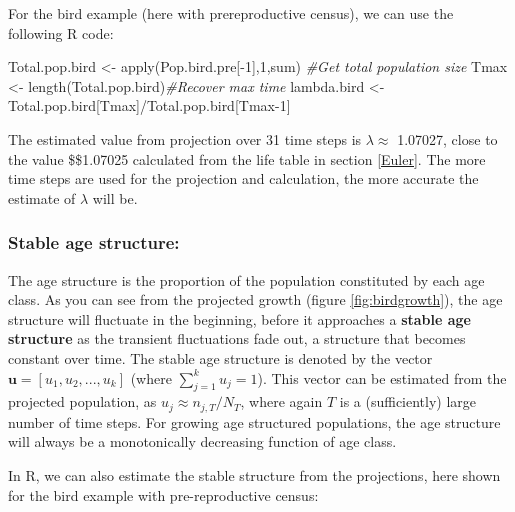 \documentclass[
]{book}
\newenvironment{Shaded}{\begin{snugshade}}{\end{snugshade}}
\newcommand{\CommentTok}[1]{\textcolor[rgb]{0.56,0.35,0.01}{\textit{#1}}}
\newcommand{\DecValTok}[1]{\textcolor[rgb]{0.00,0.00,0.81}{#1}}
\newcommand{\FunctionTok}[1]{\textcolor[rgb]{0.00,0.00,0.00}{#1}}
\newcommand{\NormalTok}[1]{#1}
\newcommand{\OtherTok}[1]{\textcolor[rgb]{0.56,0.35,0.01}{#1}}
\newcommand{\SpecialCharTok}[1]{\textcolor[rgb]{0.00,0.00,0.00}{#1}}
\begin{document}
For the bird example (here with prereproductive census), we can use the following R code:

\begin{Shaded}
\begin{Highlighting}[]
\NormalTok{Total.pop.bird }\OtherTok{\textless{}{-}} \FunctionTok{apply}\NormalTok{(Pop.bird.pre[}\SpecialCharTok{{-}}\DecValTok{1}\NormalTok{],}\DecValTok{1}\NormalTok{,sum) }\CommentTok{\#Get total population size}
\NormalTok{Tmax }\OtherTok{\textless{}{-}} \FunctionTok{length}\NormalTok{(Total.pop.bird)}\CommentTok{\#Recover max time}
\NormalTok{lambda.bird }\OtherTok{\textless{}{-}}\NormalTok{ Total.pop.bird[Tmax]}\SpecialCharTok{/}\NormalTok{Total.pop.bird[Tmax}\DecValTok{{-}1}\NormalTok{]}
\end{Highlighting}
\end{Shaded}

The estimated value from projection over 31 time steps is \(\lambda\approx\) 1.07027, close to the value \$\lambda\approx\$1.07025 calculated from the life table in section \ref{Euler}. The more time steps are used for the projection and calculation, the more accurate the estimate of \(\lambda\) will be.

\hypertarget{stable-age-structure}{%
\subsubsection*{Stable age structure:}\label{stable-age-structure}}

The age structure is the proportion of the population constituted by each age class. As you can see from the projected growth (figure \ref{fig:birdgrowth}), the age structure will fluctuate in the beginning, before it approaches a \textbf{stable age structure} as the transient fluctuations fade out, a structure that becomes constant over time. The stable age structure is denoted by the vector \(\mathbf{u}=[u_1, u_2, ..., u_k]\) (where \(\sum_{j=1}^{k} u_j=1\)). This vector can be estimated from the projected population, as \(u_j\approx n_{j,T}/N_T\), where again \(T\) is a (sufficiently) large number of time steps. For growing age structured populations, the age structure will always be a monotonically decreasing function of age class.

In R, we can also estimate the stable structure from the projections, here shown for the bird example with pre-reproductive census:
\end{document}
